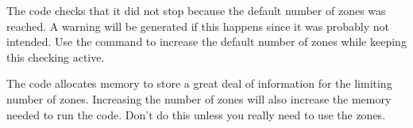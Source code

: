 The code checks that it did not stop because the default number of zones
was reached.
A warning will be generated if this happens since it was
probably not intended.
Use the  command to increase the default number
of zones while keeping this checking active.

The code allocates memory to store a great deal of information for the
limiting number of zones.
Increasing the number of zones will also increase
the memory needed to run the code.
Don't do this unless you really need
to use the zones.


